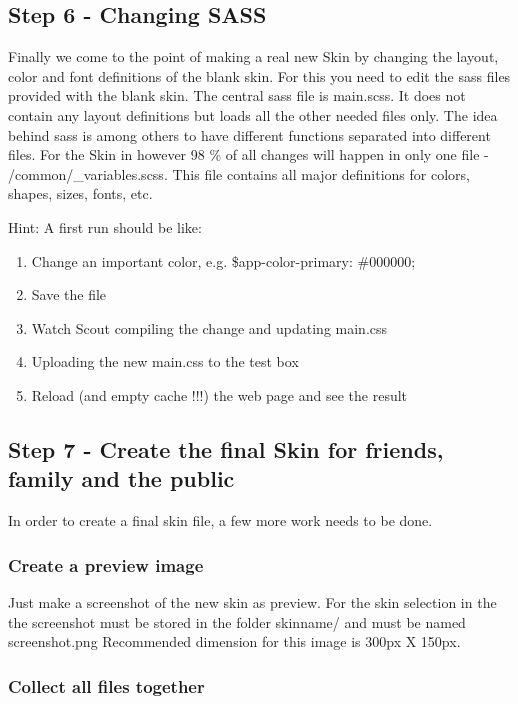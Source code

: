 \subsection{Step 6 - Changing SASS}

Finally we come to the point of making a real new Skin by changing the layout, color and 
font definitions of the blank skin. For this you need to edit the sass files provided with 
the blank skin.
The central sass file is main.scss. It does not contain any layout definitions but loads 
all the other needed files only. The idea behind sass is among others to have different 
functions separated into different files. For the Skin in \zway however 98 \% of all 
changes will happen in only one file - /common/\_variables.scss. This file contains 
all major definitions for colors, shapes, sizes, fonts, etc.

Hint: A first run should be like:
\begin{enumerate}
\item Change an important color, e.g. \$app-color-primary: \#000000;
\item Save the file
\item Watch Scout compiling the change and updating main.css
\item Uploading the new main.css to the test box
\item Reload (and empty cache !!!) the web page and see the result
\end{enumerate}

\subsection{Step 7 - Create the final Skin for friends, family and the public}

In order to create a final skin file, a few more work needs to be done.

\subsubsection{Create a preview image}

Just make a screenshot of the new skin as preview. For the skin selection in the \zwshui 
the screenshot must be stored in the folder skinname/ and must be named screenshot.png 
Recommended dimension for this image is 300px X 150px.


\subsubsection{Collect all files together}

